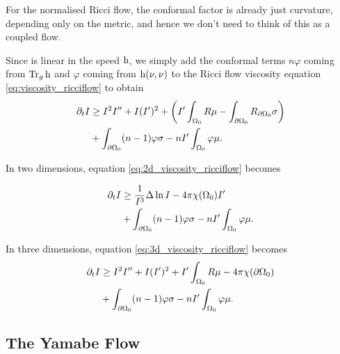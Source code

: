 \documentclass{amsart}
\begin{document}
For the normalised Ricci flow, the conformal factor is already just curvature, depending only on the metric, and hence we don't need to think of this as a coupled flow.

Since  is linear in the speed \(\operatorname{h}\), we simply add the conformal terms \(n \varphi\) coming from \(\operatorname{Tr}_g \operatorname{h}\) and \(\varphi\) coming from \(\operatorname{h}(\nu, \nu)\) to the Ricci flow viscosity equation \eqref{eq:viscosity_ricciflow} to obtain
\begin{equation}
\label{eq:viscosity_conformalcoupledricciflow}
\begin{split}
\partial_t I &\geq I^2I'' + I(I')^2 + \left(I'\int_{\Omega_0} R \mu - \int_{\partial {\Omega_0}} R_{\partial {\Omega_0}}\sigma \right) \\
&+ \int_{\partial {\Omega_0}} (n-1) \varphi\sigma - n I' \int_{\Omega_0} \varphi \mu.
\end{split}
\end{equation}

In two dimensions, equation \eqref{eq:2d_viscosity_ricciflow} becomes

\begin{equation}
\label{eq:2d_viscosity_conformalcoupledricciflow}
\begin{split}
\partial_t I &\geq \frac{1}{I^3} \Delta \ln I - 4\pi\chi(\Omega_0)I' \\
&+ \int_{\partial {\Omega_0}} (n-1) \varphi\sigma - n I' \int_{\Omega_0} \varphi \mu.
\end{split}
\end{equation}

In three dimensions, equation \eqref{eq:3d_viscosity_ricciflow} becomes
\begin{equation}
\label{eq:3d_viscosity_conformalcoupledricciflow}
\begin{split}
\partial_t I &\geq I^2I'' + I(I')^2 + I'\int_{\Omega_0} R \mu - 4\pi\chi(\partial {\Omega_0}) \\
&+ \int_{\partial {\Omega_0}} (n-1) \varphi\sigma - n I' \int_{\Omega_0} \varphi \mu.
\end{split}
\end{equation}

\subsection{The Yamabe Flow}
\label{subsec:flows_yamabe}
\end{document}
